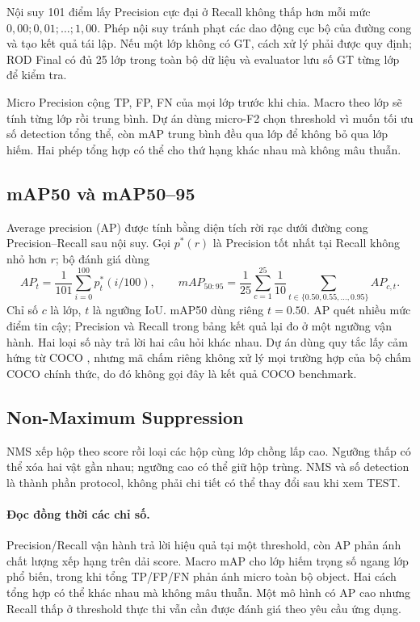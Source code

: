 \documentclass[12pt,a4paper,oneside]{report}
\begin{document}
Nội suy 101 điểm lấy Precision cực đại ở Recall không thấp hơn mỗi mức $0,00;0,01;\ldots;1,00$. Phép nội suy tránh phạt các dao động cục bộ của đường cong và tạo kết quả tái lập. Nếu một lớp không có GT, cách xử lý phải được quy định; ROD Final có đủ 25 lớp trong toàn bộ dữ liệu và evaluator lưu số GT từng lớp để kiểm tra.

Micro Precision cộng TP, FP, FN của mọi lớp trước khi chia. Macro theo lớp sẽ tính từng lớp rồi trung bình. Dự án dùng micro-F2 chọn threshold vì muốn tối ưu số detection tổng thể, còn mAP trung bình đều qua lớp để không bỏ qua lớp hiếm. Hai phép tổng hợp có thể cho thứ hạng khác nhau mà không mâu thuẫn.
\subsection{mAP50 và mAP50--95}
Average precision (AP) được tính bằng diện tích rời rạc dưới đường cong Precision--Recall sau nội suy. Gọi $p^*(r)$ là Precision tốt nhất tại Recall không nhỏ hơn $r$; bộ đánh giá dùng
\begin{equation} AP_t=\frac{1}{101}\sum_{i=0}^{100}p^*_t(i/100),\qquad
 mAP_{50:95}=\frac{1}{25}\sum_{c=1}^{25}\frac{1}{10}\sum_{t\in\{0.50,0.55,\ldots,0.95\}}AP_{c,t}.\end{equation}
Chỉ số $c$ là lớp, $t$ là ngưỡng IoU. mAP50 dùng riêng $t=0.50$. AP quét nhiều mức điểm tin cậy; Precision và Recall trong bảng kết quả lại đo ở một ngưỡng vận hành. Hai loại số này trả lời hai câu hỏi khác nhau. Dự án dùng quy tắc lấy cảm hứng từ COCO \cite{coco}, nhưng mã chấm riêng không xử lý mọi trường hợp của bộ chấm COCO chính thức, do đó không gọi đây là kết quả COCO benchmark. 
\subsection{Non-Maximum Suppression}
NMS xếp hộp theo score rồi loại các hộp cùng lớp chồng lấp cao. Ngưỡng thấp có thể xóa hai vật gần nhau; ngưỡng cao có thể giữ hộp trùng. NMS và số detection là thành phần protocol, không phải chi tiết có thể thay đổi sau khi xem TEST.

\paragraph{Đọc đồng thời các chỉ số.}
Precision/Recall vận hành trả lời hiệu quả tại một threshold, còn AP phản ánh chất lượng xếp hạng trên dải score. Macro mAP cho lớp hiếm trọng số ngang lớp phổ biến, trong khi tổng TP/FP/FN phản ánh micro toàn bộ object. Hai cách tổng hợp có thể khác nhau mà không mâu thuẫn. Một mô hình có AP cao nhưng Recall thấp ở threshold thực thi vẫn cần được đánh giá theo yêu cầu ứng dụng.
\end{document}
